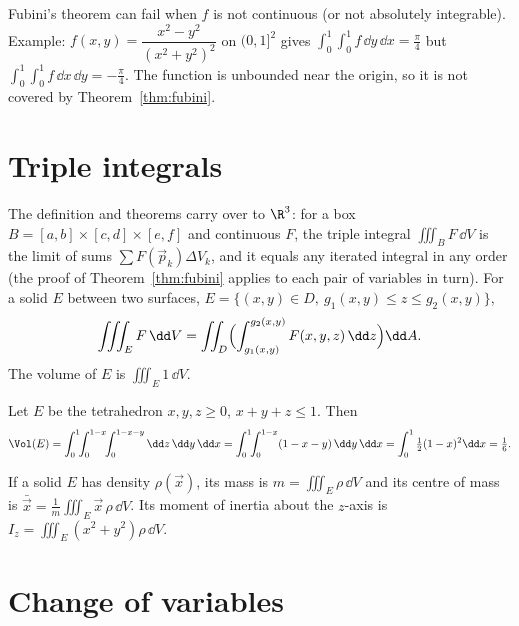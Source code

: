 \begin{pitfall}
Fubini's theorem can fail when $f$ is not continuous (or not absolutely integrable). Example: $f(x,y)=\dfrac{x^2-y^2}{(x^2+y^2)^2}$ on $(0,1]^2$ gives $\int_0^1\!\int_0^1f\,\dd y\,\dd x=\frac\pi4$ but $\int_0^1\!\int_0^1f\,\dd x\,\dd y=-\frac\pi4$. The function is unbounded near the origin, so it is not covered by Theorem~\ref{thm:fubini}.
\end{pitfall}

\section{Triple integrals}

The definition and theorems carry over to $\R^3$: for a box $B=[a,b]\times[c,d]\times[e,f]$ and continuous $F$, the triple integral $\iiint_BF\,\dd V$ is the limit of sums $\sum F(\vec p_k)\Delta V_k$, and it equals any iterated integral in any order (the proof of Theorem~\ref{thm:fubini} applies to each pair of variables in turn). For a solid $E$ between two surfaces, $E=\{(x,y)\in D,\ g_1(x,y)\le z\le g_2(x,y)\}$,
\[
\iiint_EF\,\dd V=\iint_D\Bigl(\int_{g_1(x,y)}^{g_2(x,y)}F(x,y,z)\,\dd z\Bigr)\dd A .
\]
The volume of $E$ is $\iiint_E1\,\dd V$.

\begin{example}
Let $E$ be the tetrahedron $x,y,z\ge0$, $x+y+z\le1$. Then
\[
\Vol(E)=\int_0^1\!\!\int_0^{1-x}\!\!\int_0^{1-x-y}\dd z\,\dd y\,\dd x=\int_0^1\!\!\int_0^{1-x}(1-x-y)\,\dd y\,\dd x=\int_0^1\tfrac12(1-x)^2\dd x=\tfrac16 .
\]
\end{example}

\begin{example}
If a solid $E$ has density $\rho(\vec x)$, its mass is $m=\iiint_E\rho\,\dd V$ and its centre of mass is $\bar{\vec x}=\frac1m\iiint_E\vec x\,\rho\,\dd V$. Its moment of inertia about the $z$-axis is $I_z=\iiint_E(x^2+y^2)\rho\,\dd V$.
\end{example}

\section{Change of variables}

